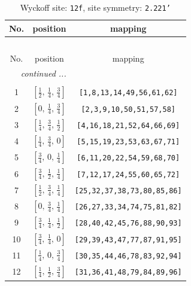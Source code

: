 \documentclass[fleqn,8pt]{jsarticle}
\begin{document}
\begin{longtable}{ccc}
\caption{Wyckoff site: {\tt 12f}, site symmetry: {\tt 2.221'}}
 \\
 \hline \hline
No. & position & mapping \\ \hline \endfirsthead

\multicolumn{2}{l}{\tablename\ \thetable{}} \\
 \hline \hline
No. & position & mapping \\ \hline \endhead

 \hline \hline
\multicolumn{2}{r}{\footnotesize\it continued ...} \\ \endfoot

 \hline \hline
\multicolumn{2}{r}{} \\ \endlastfoot

1 & $\left[ \frac{1}{2},\, \frac{1}{4},\, \frac{3}{4} \right]$ & {\tt [1,8,13,14,49,56,61,62]} \\ \hline
2 & $\left[ 0,\, \frac{1}{4},\, \frac{3}{4} \right]$ & {\tt [2,3,9,10,50,51,57,58]} \\ \hline
3 & $\left[ \frac{1}{4},\, \frac{3}{4},\, \frac{1}{2} \right]$ & {\tt [4,16,18,21,52,64,66,69]} \\ \hline
4 & $\left[ \frac{1}{4},\, \frac{3}{4},\, 0 \right]$ & {\tt [5,15,19,23,53,63,67,71]} \\ \hline
5 & $\left[ \frac{3}{4},\, 0,\, \frac{1}{4} \right]$ & {\tt [6,11,20,22,54,59,68,70]} \\ \hline
6 & $\left[ \frac{3}{4},\, \frac{1}{2},\, \frac{1}{4} \right]$ & {\tt [7,12,17,24,55,60,65,72]} \\ \hline
7 & $\left[ \frac{1}{2},\, \frac{3}{4},\, \frac{1}{4} \right]$ & {\tt [25,32,37,38,73,80,85,86]} \\ \hline
8 & $\left[ 0,\, \frac{3}{4},\, \frac{1}{4} \right]$ & {\tt [26,27,33,34,74,75,81,82]} \\ \hline
9 & $\left[ \frac{3}{4},\, \frac{1}{4},\, \frac{1}{2} \right]$ & {\tt [28,40,42,45,76,88,90,93]} \\ \hline
10 & $\left[ \frac{3}{4},\, \frac{1}{4},\, 0 \right]$ & {\tt [29,39,43,47,77,87,91,95]} \\ \hline
11 & $\left[ \frac{1}{4},\, 0,\, \frac{3}{4} \right]$ & {\tt [30,35,44,46,78,83,92,94]} \\ \hline
12 & $\left[ \frac{1}{4},\, \frac{1}{2},\, \frac{3}{4} \right]$ & {\tt [31,36,41,48,79,84,89,96]} \\
\end{longtable}
\renewcommand{\arraystretch}{1.2}
\end{document}
